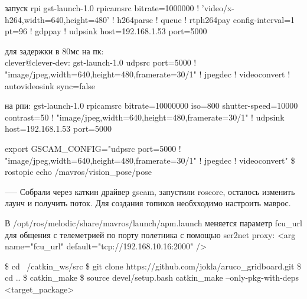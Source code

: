 запуск rpi
gst-launch-1.0 rpicamsrc bitrate=1000000 ! 'video/x-h264,width=640,height=480' ! h264parse ! queue ! rtph264pay config-interval=1 pt=96 ! gdppay ! udpsink host=192.168.1.53 port=5000

для задержки в 80мс на пк:\\
clever@clever-dev: gst-launch-1.0 udpsrc port=5000 ! "image/jpeg,width=640,height=480,framerate=30/1" ! jpegdec ! videoconvert ! autovideosink sync=false

на рпи:
gst-launch-1.0 rpicamsrc bitrate=10000000 iso=800 shutter-speed=10000 contrast=50 ! "image/jpeg,width=640,height=480,framerate=30/1" ! udpsink host=192.168.1.53 port=5000

export GSCAM_CONFIG="udpsrc port=5000 ! "image/jpeg,width=640,height=480,framerate=30/1" ! jpegdec ! videoconvert"
\$ rostopic echo /mavros/vision_pose/pose

-----
Собрали через каткин драйвер gscam, запустили roscore, осталось изменить лаунч и получить поток.
Для создания топиков необхходимо настроить маврос.

В /opt/ros/melodic/share/mavros/launch/apm.launch меняется параметр fcu\_url для общения с телеметрией по порту полетника с помощью ser2net proxy:
<arg name="fcu\_url" default="tcp://192.168.10.16:2000" />

\$ cd ~/catkin\_ws/src
\$ git clone https://github.com/jokla/aruco\_gridboard.git
\$ cd ..
\$ catkin\_make
\$ source devel/setup.bash
catkin\_make --only-pkg-with-deps <target\_package>


